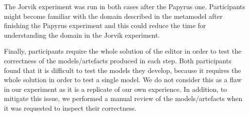 The Jorvik experiment was run in both cases after the Papyrus one. Participants might become familiar with the domain described in the metamodel after finishing the Papyrus experiment and this could reduce the time for understanding the domain in the Jorvik experiment. 

Finally, participants require the whole solution of the editor in order to test the correctness of the models/artefacts produced in each step. Both participants found that it is difficult to test the models they develop, because it requires the whole solution in order to test a single model. We do not consider this as a flaw in our experiment as it is a replicate of our own experience.
In addition, to mitigate this issue, we performed a manual review of the models/artefacts when it was requested to inspect their correctness.
